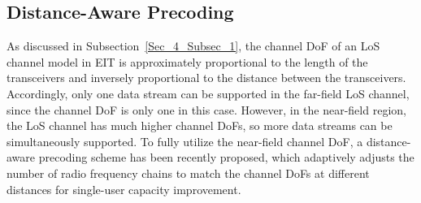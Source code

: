 \documentclass[journal,twocolumn]{IEEEtran}
\begin{document}



\vspace{-1mm}
\subsection{Distance-Aware Precoding}
As discussed in Subsection~\ref{Sec_4_Subsec_1}, the channel DoF of an LoS channel model in EIT is approximately proportional to the length of the transceivers and inversely proportional to the distance between the transceivers. 
Accordingly, only one data stream can be supported in the far-field LoS channel, since the channel DoF is only one in this case. 
However, in the near-field region, the LoS channel has much higher channel DoFs, so more data streams can be simultaneously supported.
To fully utilize the near-field channel DoF, a distance-aware precoding scheme has been recently proposed, which adaptively adjusts the number of radio frequency chains to match the channel DoFs at different distances for single-user capacity improvement.   
\end{document}
